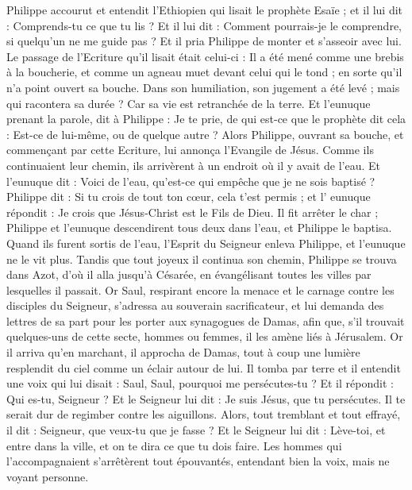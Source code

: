 \begin{multicols}{2}
Philippe accourut et entendit l’Ethiopien qui lisait le prophète Esaïe ; et il lui dit : Comprends-tu ce que tu lis ?
Et il lui dit : Comment pourrais-je le comprendre, si quelqu'un ne me guide pas ? Et il pria Philippe de monter et s'asseoir avec lui.
Le passage de l'Ecriture qu'il lisait était celui-ci : Il a été mené comme une brebis à la boucherie, et comme un agneau muet devant celui qui le tond ; en sorte qu'il n'a point ouvert sa bouche.
Dans son humiliation, son jugement a été levé ; mais qui racontera sa durée ? Car sa vie est retranchée de la terre.
Et l'eunuque prenant la parole, dit à Philippe : Je te prie, de qui est-ce que le prophète dit cela : Est-ce de lui-même, ou de quelque autre ?
Alors Philippe, ouvrant sa bouche, et commençant par cette Ecriture, lui annonça l’Evangile de Jésus.
Comme ils continuaient leur chemin, ils arrivèrent à un endroit où il y avait de l'eau. Et l'eunuque dit : Voici de l'eau, qu'est-ce qui empêche que je ne sois baptisé ?
Philippe dit : Si tu crois de tout ton cœur, cela t'est permis ; et l' eunuque répondit : Je crois que Jésus-Christ est le Fils de Dieu.
Il fit arrêter le char ; Philippe et l’eunuque descendirent tous deux dans l'eau, et Philippe le baptisa.
Quand ils furent sortis de l'eau, l'Esprit du Seigneur enleva Philippe, et l'eunuque ne le vit plus. Tandis que tout joyeux il continua son chemin,
Philippe se trouva dans Azot, d’où il alla jusqu’à Césarée, en évangélisant toutes les villes par lesquelles il passait.
\VerseOne{}Or Saul, respirant encore la menace et le carnage contre les disciples du Seigneur, s’adressa au souverain sacrificateur,
et lui demanda des lettres de sa part pour les porter aux synagogues de Damas, afin que, s'il trouvait quelques-uns de cette secte, hommes ou femmes, il les amène liés à Jérusalem.
Or il arriva qu'en marchant, il approcha de Damas, tout à coup une lumière resplendit du ciel comme un éclair autour de lui.
Il tomba par terre et il entendit une voix qui lui disait : Saul, Saul, pourquoi me persécutes-tu ?
Et il répondit : Qui es-tu, Seigneur ? Et le Seigneur lui dit : Je suis Jésus, que tu persécutes. Il te serait dur de regimber contre les aiguillons.
Alors, tout tremblant et tout effrayé, il dit : Seigneur, que veux-tu que je fasse ? Et le Seigneur lui dit : Lève-toi, et entre dans la ville, et on te dira ce que tu dois faire.
Les hommes qui l’accompagnaient s'arrêtèrent tout épouvantés, entendant bien la voix, mais ne voyant personne.

\end{multicols}
